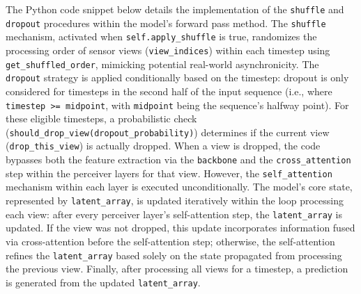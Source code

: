 The Python code snippet below details the implementation of the \texttt{shuffle} and \texttt{dropout} procedures within the model's forward pass method. The \texttt{shuffle} mechanism, activated when \texttt{self.apply\_shuffle} is true, randomizes the processing order of sensor views (\texttt{view\_indices}) within each timestep using \texttt{get\_shuffled\_order}, mimicking potential real-world asynchronicity. The \texttt{dropout} strategy is applied conditionally based on the timestep: dropout is only considered for timesteps in the second half of the input sequence (i.e., where \texttt{timestep >= midpoint}, with \texttt{midpoint} being the sequence's halfway point). For these eligible timesteps, a probabilistic check (\texttt{should\_drop\_view(dropout\_probability)}) determines if the current view (\texttt{drop\_this\_view}) is actually dropped. When a view is dropped, the code bypasses both the feature extraction via the \texttt{backbone} and the \texttt{cross\_attention} step within the perceiver layers for that view. However, the \texttt{self\_attention} mechanism within each layer is executed unconditionally. The model's core state, represented by \texttt{latent\_array}, is updated iteratively within the loop processing each view: after every perceiver layer's self-attention step, the \texttt{latent\_array} is updated. If the view was not dropped, this update incorporates information fused via cross-attention before the self-attention step; otherwise, the self-attention refines the \texttt{latent\_array} based solely on the state propagated from processing the previous view. Finally, after processing all views for a timestep, a prediction is generated from the updated \texttt{latent\_array}.

